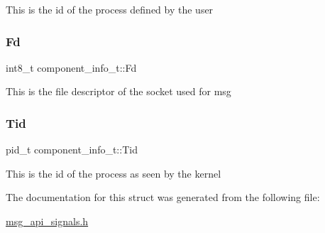 This is the id of the process defined by the user \mbox{\label{structcomponent__info__t_a45e7ac1a6e936b8abf385a704d136351}} 
\subsubsection{\texorpdfstring{Fd}{Fd}}
{\footnotesize\ttfamily int8\+\_\+t component\+\_\+info\+\_\+t\+::\+Fd}

This is the file descriptor of the socket used for msg \mbox{\label{structcomponent__info__t_a1d476cfc985de67209644f02cbfc97fa}} 
\subsubsection{\texorpdfstring{Tid}{Tid}}
{\footnotesize\ttfamily pid\+\_\+t component\+\_\+info\+\_\+t\+::\+Tid}

This is the id of the process as seen by the kernel 

The documentation for this struct was generated from the following file\+:\begin{DoxyCompactItemize}
\item 
\mbox{\hyperlink{msg__api__signals_8h}{msg\+\_\+api\+\_\+signals.\+h}}\end{DoxyCompactItemize}
